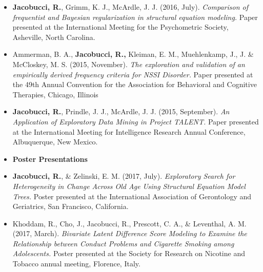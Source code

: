 \documentclass[letterpaper,10pt]{article}
\begin{document}
\begin{itemize}
	\item[] \textbf{Jacobucci, R.}, Grimm, K. J., McArdle, J. J. (2016, July). \emph{Comparison of frequentist and Bayesian regularization in structural equation modeling.} Paper presented at the International Meeting for the Psychometric Society, Asheville, North Carolina.
	\item[]Ammerman, B. A., \textbf{Jacobucci, R.,} Kleiman, E. M., Muehlenkamp, J., J. \& McCloskey, M. S. (2015, November). \emph{The exploration and validation of an empirically derived frequency criteria for NSSI Disorder.} Paper presented at the 49th Annual Convention for the Association for Behavioral and Cognitive Therapies, Chicago, Illinois
	\item[] \textbf{Jacobucci, R.}, Prindle, J. J., McArdle, J. J. (2015, September). \emph{An Application of Exploratory Data Mining in Project TALENT.} Paper presented at the International Meeting for Intelligence Research Annual Conference, Albuquerque, New Mexico.
	\item {\textbf{\large{Poster Presentations}}}
	
	\item[] \textbf{Jacobucci, R.}, \& Zelinski, E. M. (2017, July). \emph{Exploratory Search for Heterogeneity in Change Across Old Age Using Structural Equation Model Trees.} Poster presented at the International Association of Gerontology and Geriatrics, San Francisco, California.
	
	\item[]Khoddam, R., Cho, J., Jacobucci, R., Prescott, C. A., \& Leventhal, A. M. (2017, March). \textit{Bivariate Latent Difference Score Modeling to Examine the Relationship between Conduct Problems and Cigarette Smoking among Adolescents.} Poster presented at the Society for Research on Nicotine and Tobacco annual meeting, Florence, Italy.    
	

\end{itemize}
\end{document}
